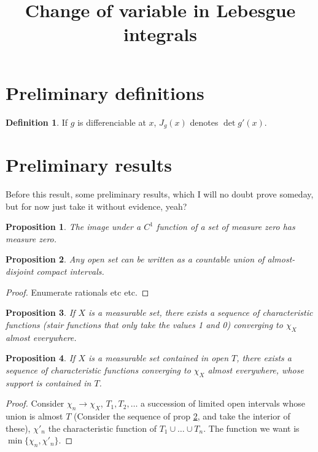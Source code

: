 \documentclass[11pt]{article}
\title{\textbf{Change of variable in Lebesgue integrals}}
\author{}
\date{}
\theoremstyle{definition}
\newtheorem{definition}{Definition}
\theoremstyle{plain}
\newtheorem{prop}{Proposition}
\begin{document}
\maketitle

\section{Preliminary definitions}

\begin{definition}
If $g$ is differenciable at $x$, $J_g(x)$ denotes $\det g'(x)$.
\end{definition}

\section{Preliminary results}

Before this result, some preliminary results, which I will no doubt prove someday, but for now just take it without evidence, yeah?

\begin{prop}\label{measurezeroc1}
The image under a $C^1$ function of a set of measure zero has measure zero.
\end{prop}

\begin{prop}\label{compactunion}
Any open set can be written as a countable union of almost-disjoint compact intervals.
\end{prop}

\begin{proof}
Enumerate rationals etc etc.
\end{proof}

\begin{prop}
If $X$ is a measurable set, there exists a sequence of characteristic functions (stair functions that only take the values 1 and 0) converging to $\chi_X$ almost everywhere.
\end{prop}

\begin{prop}
If $X$ is a measurable set contained in open $T$, there exists a sequence of characteristic functions converging to $\chi_X$ almost everywhere, whose support is contained in $T$.
\end{prop}

\begin{proof}
Consider $\chi_n \rightarrow \chi_X$, $T_1, T_2, \ldots$ a succession of limited open intervals whose union is almost $T$ (Consider the sequence of prop \ref{compactunion}, and take the interior of these), $\chi'_n$ the characteristic function of $T_1 \cup \ldots \cup T_n$. The function we want is $\min\{\chi_n, \chi'_n\}$.
\end{proof}
\end{document}
